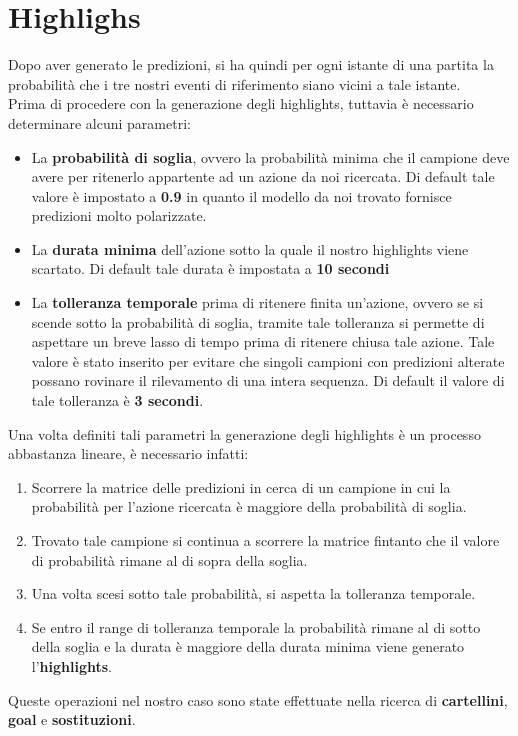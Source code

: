 \section{Highlighs}
Dopo aver generato le predizioni, si ha quindi per ogni istante di una partita la probabilità che i tre nostri eventi di riferimento siano vicini a tale istante.
\\Prima di procedere con la generazione degli highlights, tuttavia è necessario determinare alcuni parametri:
\begin{itemize}
\item La \textbf{probabilità di soglia}, ovvero la probabilità minima che il campione deve avere per ritenerlo appartente ad un azione da noi ricercata. Di default tale valore è impostato a \textbf{0.9} in quanto il modello da noi trovato fornisce predizioni molto polarizzate.
\item La \textbf{durata minima} dell'azione sotto la quale il nostro highlights viene scartato. Di default tale durata è impostata a \textbf{10 secondi}
\item La \textbf{tolleranza temporale} prima di ritenere finita un'azione, ovvero se si scende sotto la probabilità di soglia, tramite tale tolleranza si permette di aspettare un breve lasso di tempo prima di ritenere chiusa tale azione.
Tale valore è stato inserito per evitare che singoli campioni con predizioni alterate possano rovinare il rilevamento di una intera sequenza. Di default il valore di tale tolleranza è \textbf{3 secondi}.
\end{itemize}
Una volta definiti tali parametri la generazione degli highlights è un processo abbastanza lineare, è necessario infatti:
\begin{enumerate}
\item Scorrere la matrice delle predizioni in cerca di un campione in cui la probabilità per l'azione ricercata è maggiore della probabilità di soglia.
\item Trovato tale campione si continua a scorrere la matrice fintanto che il valore di probabilità rimane al di sopra della soglia.
\item Una volta scesi sotto tale probabilità, si aspetta la tolleranza temporale.
\item Se entro il range di tolleranza temporale la probabilità rimane al di sotto della soglia e la durata è maggiore della durata minima viene generato l'\textbf{highlights}.
\end{enumerate}
Queste operazioni nel nostro caso sono state effettuate nella ricerca di \textbf{cartellini}, \textbf{goal} e \textbf{sostituzioni}.
